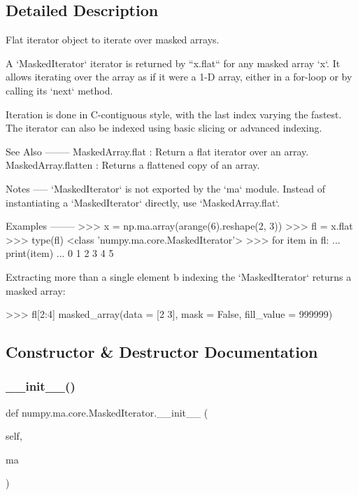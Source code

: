 \subsection{Detailed Description}
\begin{DoxyVerb}Flat iterator object to iterate over masked arrays.

A `MaskedIterator` iterator is returned by ``x.flat`` for any masked array
`x`. It allows iterating over the array as if it were a 1-D array,
either in a for-loop or by calling its `next` method.

Iteration is done in C-contiguous style, with the last index varying the
fastest. The iterator can also be indexed using basic slicing or
advanced indexing.

See Also
--------
MaskedArray.flat : Return a flat iterator over an array.
MaskedArray.flatten : Returns a flattened copy of an array.

Notes
-----
`MaskedIterator` is not exported by the `ma` module. Instead of
instantiating a `MaskedIterator` directly, use `MaskedArray.flat`.

Examples
--------
>>> x = np.ma.array(arange(6).reshape(2, 3))
>>> fl = x.flat
>>> type(fl)
<class 'numpy.ma.core.MaskedIterator'>
>>> for item in fl:
...     print(item)
...
0
1
2
3
4
5

Extracting more than a single element b indexing the `MaskedIterator`
returns a masked array:

>>> fl[2:4]
masked_array(data = [2 3],
             mask = False,
       fill_value = 999999)\end{DoxyVerb}
 

\subsection{Constructor \& Destructor Documentation}
\mbox{\label{classnumpy_1_1ma_1_1core_1_1MaskedIterator_a463c3a68c63c19d1f930f176e0d112da}} 
\subsubsection{\texorpdfstring{\+\_\+\+\_\+init\+\_\+\+\_\+()}{\_\_init\_\_()}}
{\footnotesize\ttfamily def numpy.\+ma.\+core.\+Masked\+Iterator.\+\_\+\+\_\+init\+\_\+\+\_\+ (\begin{DoxyParamCaption}\item[{}]{self,  }\item[{}]{ma }\end{DoxyParamCaption})}



